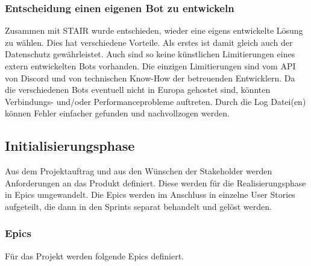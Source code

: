 \documentclass[a4paper, table]{article}
\begin{document}
\subsubsection*{Entscheidung einen eigenen Bot zu entwickeln}
Zusammen mit STAIR wurde entschieden, wieder eine eigens entwickelte Lösung zu wählen. 
Dies hat verschiedene Vorteile. 
Als erstes ist damit gleich auch der Datenschutz gewährleistet. 
Auch sind so keine künstlichen Limitierungen eines extern entwickelten Bots vorhanden. 
Die einzigen Limitierungen sind vom \gls{API} von Discord und von technischen Know-How der betreuenden Entwicklern. 
Da die verschiedenen Bots eventuell nicht in Europa gehostet sind, könnten Verbindungs- und/oder Performanceprobleme auftreten. 
Durch die Log Datei(en) können Fehler einfacher gefunden und nachvollzogen werden.

\newpage
\subsection{Initialisierungsphase}
Aus dem Projektauftrag und aus den Wünschen der Stakeholder werden Anforderungen an das Produkt definiert. 
Diese werden für die Realisierungsphase in Epics umgewandelt. 
Die Epics werden im Anschluss in einzelne User Stories aufgeteilt, die dann in den Sprints separat behandelt und gelöst werden.

\subsubsection{Epics}\label{Epics}
Für das Projekt werden folgende Epics definiert.
\end{document}
